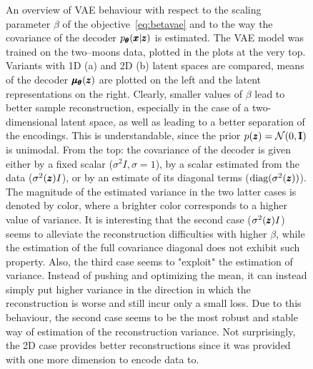 \begin{figure}
\caption{An overview of VAE behaviour with respect to the scaling parameter $\beta$ of the objective~\eqref{eq:betavae} and to the way the covariance of the decoder $p_{\pmb{{\theta}}}(\pmb{{x}}|\pmb{{z}})$ is estimated. The VAE model was trained on the two--moons data, plotted in the plots at the very top. Variants with 1D (a) and 2D (b) latent spaces are compared, means of the decoder $\pmb{{\mu}}_{\pmb{{\theta}}}(\pmb{{z}})$ are plotted on the left and the latent representations on the right. Clearly, smaller values of $\beta$ lead to better sample reconstruction, especially in the case of a two-dimensional latent space, as well as leading to a better separation of the encodings. This is understandable, since the prior $p(\pmb{{z}})=\mathcal{N}(0,\textbf{I})$ is unimodal. From the top: the covariance of the decoder is given either by a fixed scalar ($\sigma^2 I,\sigma=1$), by a scalar estimated from the data ($\sigma^2(\pmb{{z}})I$), or by an estimate of its diagonal terms ($\text{diag}(\sigma^2(\pmb{{z}}))$). The magnitude of the estimated variance in the two latter cases is denoted by color, where a brighter color corresponds to a higher value of variance. It is interesting that the second case ($\sigma^2(\pmb{{z}})I$) seems to alleviate the reconstruction difficulties with higher $\beta$, while the estimation of the full covariance diagonal does not exhibit such property. Also, the third case seems to "exploit" the estimation of variance. Instead of pushing and optimizing the mean, it can instead simply put higher variance in the direction in which the reconstruction is worse and still incur only a small loss. Due to this behaviour, the second case seems to be the most robust and stable way of estimation of the reconstruction variance. Not surprisingly, the 2D case provides better reconstructions since it was provided with one more dimension to encode data to.}
\label{fig:betavae}
\end{figure}

